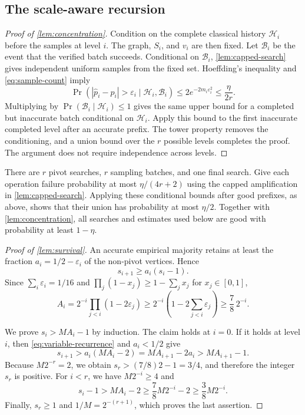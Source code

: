 \subsection{The scale-aware recursion}

\begin{proof}[Proof of \cref{lem:concentration}]
Condition on the complete classical history $\mathcal H_i$ before the samples
at level $i$.  The graph, $S_i$, and $v_i$ are then fixed.  Let
$\mathcal B_i$ be the event that the verified batch succeeds.  Conditional on
$\mathcal B_i$, \cref{lem:capped-search} gives independent uniform samples
from the fixed set.  Hoeffding's inequality \cite{Hoeffding1963} and
\cref{eq:sample-count} imply
\[
 \Pr\!\left(
 |\widehat p_i-p_i|>\varepsilon_i\mid\mathcal H_i,\mathcal B_i
 \right)
 \le2e^{-2m_i\varepsilon_i^2}
 \le\frac{\eta}{2r}.
\]
Multiplying by $\Pr(\mathcal B_i\mid\mathcal H_i)\le1$ gives the same upper
bound for a completed but inaccurate batch conditional on $\mathcal H_i$.
Apply this bound to the first inaccurate completed level after an accurate
prefix.  The tower property removes the conditioning, and a union bound over
the $r$ possible levels completes the proof.  The argument does not require
independence across levels.
\end{proof}

There are $r$ pivot searches, $r$ sampling batches, and one final search.
Give each operation failure probability at most $\eta/(4r+2)$ using the
capped amplification in \cref{lem:capped-search}.  Applying these conditional
bounds after good prefixes, as above, shows that their union has probability
at most $\eta/2$.  Together with \cref{lem:concentration}, all searches and
estimates used below are good with probability at least $1-\eta$.

\begin{proof}[Proof of \cref{lem:survival}]
An accurate empirical majority retains at least the fraction
$a_i=1/2-\varepsilon_i$ of the non-pivot vertices.  Hence
\begin{equation}\label{eq:variable-recurrence}
 s_{i+1}\ge a_i(s_i-1).
\end{equation}
Since $\sum_i\varepsilon_i=1/16$ and
$\prod_j(1-x_j)\ge1-\sum_jx_j$ for $x_j\in[0,1]$,
\[
 A_i
 =2^{-i}\prod_{j<i}(1-2\varepsilon_j)
 \ge2^{-i}\left(1-2\sum_{j<i}\varepsilon_j\right)
 \ge\frac78\,2^{-i}.
\]

We prove $s_i>MA_i-1$ by induction.  The claim holds at $i=0$.  If it holds
at level $i$, then \cref{eq:variable-recurrence} and $a_i<1/2$ give
\[
 s_{i+1}>a_i(MA_i-2)=MA_{i+1}-2a_i>MA_{i+1}-1.
\]
Because $M2^{-r}=2$, we obtain
$s_r>(7/8)2-1=3/4$, and therefore the integer $s_r$ is positive.  For $i<r$,
we have $M2^{-i}\ge4$ and
\[
 s_i-1>MA_i-2
 \ge\frac78M2^{-i}-2
 \ge\frac38M2^{-i}.
\]
Finally, $s_r\ge1$ and $1/M=2^{-(r+1)}$, which proves the last assertion.
\end{proof}

